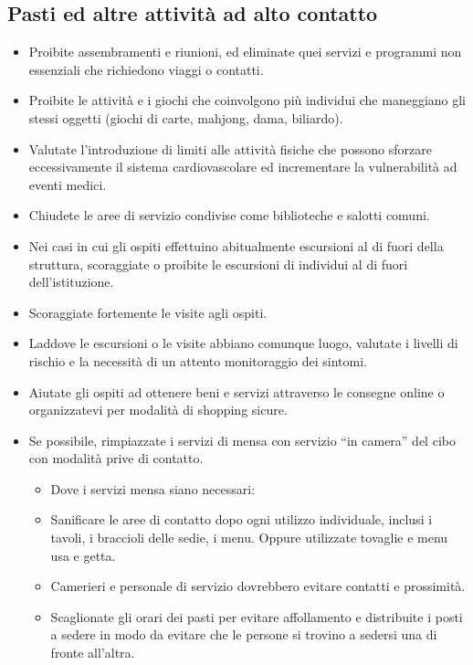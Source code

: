 \documentclass[onecolumn,journal]{IEEEtran}
\begin{document}
\begin{multicols}{2}
\begin{itemize}
\end{itemize}

\subsection*{Pasti ed altre attività ad alto contatto}

\begin{itemize}
\item  Proibite assembramenti e riunioni, ed eliminate quei servizi e programmi non essenziali che richiedono viaggi o contatti.
\item  Proibite le attività e i giochi che coinvolgono più individui che maneggiano gli stessi oggetti (giochi di carte, mahjong, dama, biliardo).
\item  Valutate l’introduzione di limiti alle attività fisiche che possono sforzare eccessivamente il sistema cardiovascolare ed incrementare la vulnerabilità ad eventi medici.
\item  Chiudete le aree di servizio condivise come biblioteche e salotti comuni.
\item  Nei casi in cui gli ospiti effettuino abitualmente escursioni al di fuori della struttura, scoraggiate o proibite le escursioni di individui al di fuori dell’istituzione.
\item  Scoraggiate fortemente le visite agli ospiti.
\item  Laddove le escursioni o le visite abbiano comunque luogo, valutate i livelli di rischio e la necessità di un attento monitoraggio dei sintomi.
\item  Aiutate gli ospiti ad ottenere beni e servizi attraverso le consegne online o organizzatevi per modalità di shopping sicure.
\item  Se possibile, rimpiazzate i servizi di mensa con servizio “in camera” del cibo con modalità prive di contatto.
  \begin{itemize}
  \item Dove i servizi mensa siano necessari:
  \item Sanificare le aree di contatto dopo ogni utilizzo individuale, inclusi i tavoli, i braccioli delle sedie, i menu. Oppure utilizzate tovaglie e menu usa e getta.
  \item Camerieri e personale di servizio dovrebbero evitare contatti e prossimità.
  \item Scaglionate gli orari dei pasti per evitare affollamento e distribuite i posti a sedere in modo da evitare che le persone si trovino a sedersi una di fronte all’altra.
  \end{itemize}


\end{itemize}
\end{multicols}
\end{document}
